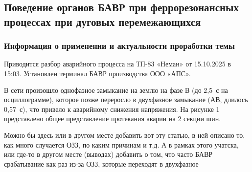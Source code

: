 
\subsection{Поведение органов БАВР при феррорезонансных процессах при дуговых перемежающихся }
\label{sec:ch1_ferroresonance_ozz}

\subsubsection{Информация о применении и актуальности проработки темы}

Приводится разбор аварийного процесса на ТП-83 «Неман» от 15.10.2025 в 15:03. Установлен
терминал БАВР производства ООО «АПС».

В сети произошло однофазное замыкание на землю на фазе В (до 2,5~с на осциллограмме),
которое позже переросло в двухфазное замыкание (АВ, длилось 0,57~с), что привело к
аварийному снижения напряжения. На рисунке 1 представлено общее представление протекания
аварии на 2 секции шин.

Можно бы здесь или в другом месте добавить вот эту статью, в ней описано то, как много
случается ОЗЗ, по каким причинам и т.д. А в рамках этого учатска, или где-то в другом
месте (выводах) добавить о том, что часто БАВР срабатывание как раз из-за ОЗЗ, которые
переходят в двухфазное

